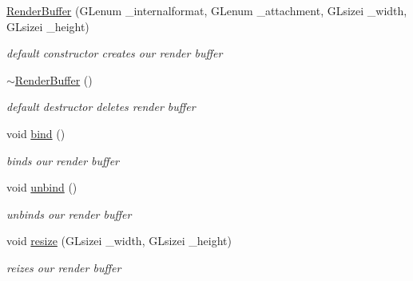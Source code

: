 \begin{DoxyCompactItemize}
\item 
\hypertarget{class_render_buffer_ac3494e7208c1b9fee4e0ff61b24d38ee}{\hyperlink{class_render_buffer_ac3494e7208c1b9fee4e0ff61b24d38ee}{Render\-Buffer} (G\-Lenum \-\_\-internalformat, G\-Lenum \-\_\-attachment, G\-Lsizei \-\_\-width, G\-Lsizei \-\_\-height)}\label{class_render_buffer_ac3494e7208c1b9fee4e0ff61b24d38ee}

\begin{DoxyCompactList}\small\item\em default constructor creates our render buffer \end{DoxyCompactList}\item 
\hypertarget{class_render_buffer_a19e7ab6e01523fffea6d5415510889d6}{\hyperlink{class_render_buffer_a19e7ab6e01523fffea6d5415510889d6}{$\sim$\-Render\-Buffer} ()}\label{class_render_buffer_a19e7ab6e01523fffea6d5415510889d6}

\begin{DoxyCompactList}\small\item\em default destructor deletes render buffer \end{DoxyCompactList}\item 
\hypertarget{class_render_buffer_ae0ae7cf1d85a6a4bee741a0132b2b8ab}{void \hyperlink{class_render_buffer_ae0ae7cf1d85a6a4bee741a0132b2b8ab}{bind} ()}\label{class_render_buffer_ae0ae7cf1d85a6a4bee741a0132b2b8ab}

\begin{DoxyCompactList}\small\item\em binds our render buffer \end{DoxyCompactList}\item 
\hypertarget{class_render_buffer_aacb6894f0d626da9e35c383674be7f86}{void \hyperlink{class_render_buffer_aacb6894f0d626da9e35c383674be7f86}{unbind} ()}\label{class_render_buffer_aacb6894f0d626da9e35c383674be7f86}

\begin{DoxyCompactList}\small\item\em unbinds our render buffer \end{DoxyCompactList}\item 
void \hyperlink{class_render_buffer_a7dfe2482e11ec51c8ebd687d9ff0a045}{resize} (G\-Lsizei \-\_\-width, G\-Lsizei \-\_\-height)
\begin{DoxyCompactList}\small\item\em reizes our render buffer \end{DoxyCompactList}\end{DoxyCompactItemize}
